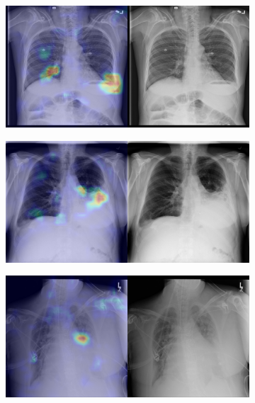 \begin{figure}[b]
\begin{subfigure}{0.4\textwidth}
    \end{subfigure}
    \begin{subfigure}{0.4\textwidth}
        \centering
        \includegraphics[width=1.0\textwidth]{Chapters/5. Conclusiones/img/Atelectasis/1_1_00000150_004.png}
    \end{subfigure}
    \begin{subfigure}{0.4\textwidth}
        \centering
        \includegraphics[width=1.0\textwidth]{Chapters/5. Conclusiones/img/Atelectasis/1_1_00000467_000.png}
    \end{subfigure}
    \begin{subfigure}{0.4\textwidth}
        \centering
        \includegraphics[width=1.0\textwidth]{Chapters/5. Conclusiones/img/Atelectasis/1_1_00000032_036.png}

\end{subfigure}
\end{figure}
